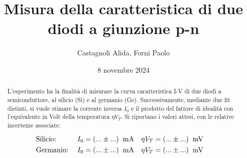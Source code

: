 \documentclass[11pt]{article}
\begin{document}

\title{\textbf{Misura della caratteristica di due diodi a giunzione p-n}}
\author{Castagnoli Alida, Forni Paolo}
\date{8 novembre 2024}
\maketitle

\begin{abstract}
    L'esperimento ha la finalità di misurare la curva caratteristica \mbox{I-V} di due diodi a semiconduttore, al silicio (Si) e al germanio (Ge). 
    Successivamente, mediante due fit distinti, si vuole stimare la corrente inversa $I_{0}$ e il prodotto del fattore di idealità con l'equivalente in Volt della temperatura $\eta V_{T}$.  
    Si riportano i valori attesi, con le relative incertezze associate:

    \begin{align*}
        &\textnormal{Silicio:} \;
        &I_{0} &= (... \pm ...) \;\;\textnormal{mA} &
        \eta V_{T} &= (... \pm ...)\;\;\textnormal{mV} & \\
        &\textnormal{Germanio:} \;
        &I_{0} &= (... \pm ...) \;\;\textnormal{mA} &
        \eta V_{T} &= (... \pm ...)\;\;\textnormal{mV} &
    \end{align*}

\end{abstract}
% 



\end{document}
